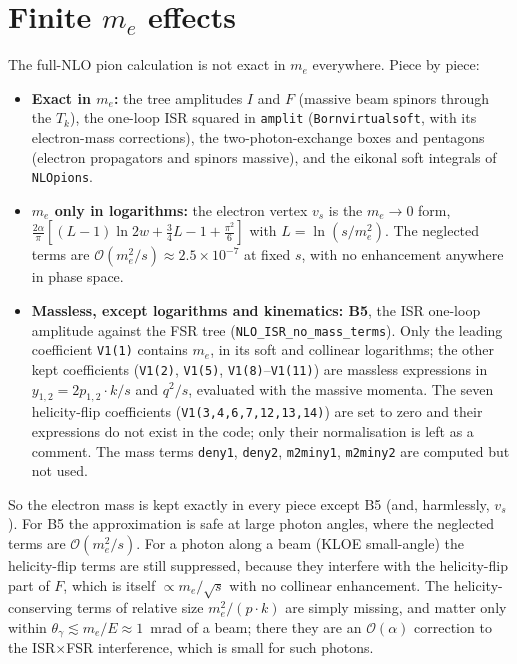 \documentclass[11pt,a4paper]{article}
\newcommand{\code}[1]{\texttt{#1}}
\begin{document}
\section{Finite \texorpdfstring{$m_e$}{m\_e} effects}
\label{app:me}
The full-NLO pion calculation is not exact in $m_e$ everywhere. Piece by piece:
\begin{itemize}
\item \textbf{Exact in $m_e$:} the tree amplitudes $I$ and $F$ (massive beam spinors through the
  $T_k$), the one-loop ISR squared in \code{amplit} (\code{Bornvirtualsoft}, with its
  electron-mass corrections), the two-photon-exchange boxes and pentagons (electron propagators
  and spinors massive), and the eikonal soft integrals of \code{NLOpions}.
\item \textbf{$m_e$ only in logarithms:} the electron vertex $v_s$ is the $m_e\to0$ form,
  $\frac{2\alpha}{\pi}[(L-1)\ln2w+\frac34L-1+\frac{\pi^2}{6}]$ with $L=\ln(s/m_e^2)$. The
  neglected terms are $\mathcal O(m_e^2/s)\approx2.5\times10^{-7}$ at fixed $s$, with no
  enhancement anywhere in phase space.
\item \textbf{Massless, except logarithms and kinematics: B5}, the ISR one-loop amplitude against
  the FSR tree (\code{NLO\_ISR\_no\_mass\_terms}). Only the leading coefficient \code{V1(1)}
  contains $m_e$, in its soft and collinear logarithms; the other kept coefficients
  (\code{V1(2)}, \code{V1(5)}, \code{V1(8)}--\code{V1(11)}) are massless expressions in
  $y_{1,2}=2p_{1,2}\cdot k/s$ and $q^2/s$, evaluated with the massive momenta. The seven
  helicity-flip coefficients (\code{V1(3,4,6,7,12,13,14)}) are set to zero and their expressions
  do not exist in the code; only their normalisation is left as a comment. The mass terms
  \code{deny1}, \code{deny2}, \code{m2miny1}, \code{m2miny2} are computed but not used.
\end{itemize}
So the electron mass is kept exactly in every piece except B5 (and, harmlessly, $v_s$).
For B5 the approximation is safe at large photon angles, where the neglected terms are
$\mathcal O(m_e^2/s)$. For a photon along a beam (KLOE small-angle) the helicity-flip terms are
still suppressed, because they interfere with the helicity-flip part of $F$, which is itself
$\propto m_e/\sqrt s$ with no collinear enhancement. The helicity-conserving terms of relative
size $m_e^2/(p\cdot k)$ are simply missing, and matter only within $\theta_\gamma\lesssim
m_e/E\approx1$~mrad of a beam; there they are an $\mathcal O(\alpha)$ correction to the
ISR$\times$FSR interference, which is small for such photons.
\end{document}
